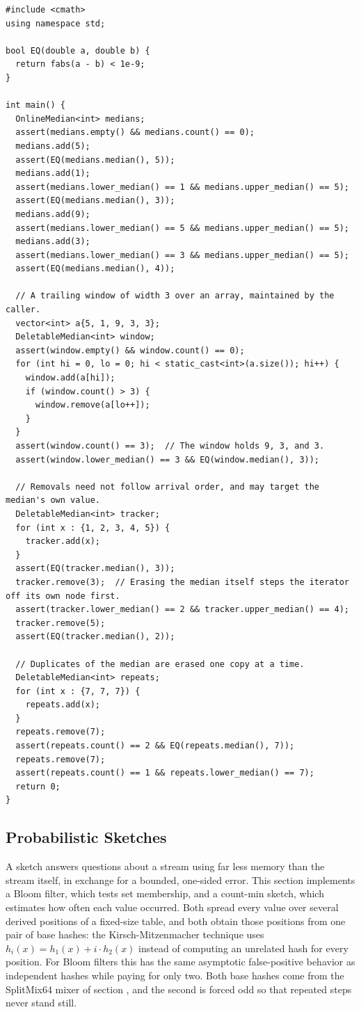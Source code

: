 \begin{lstlisting}[style=cpp]
#include <cmath>
using namespace std;

bool EQ(double a, double b) {
  return fabs(a - b) < 1e-9;
}

int main() {
  OnlineMedian<int> medians;
  assert(medians.empty() && medians.count() == 0);
  medians.add(5);
  assert(EQ(medians.median(), 5));
  medians.add(1);
  assert(medians.lower_median() == 1 && medians.upper_median() == 5);
  assert(EQ(medians.median(), 3));
  medians.add(9);
  assert(medians.lower_median() == 5 && medians.upper_median() == 5);
  medians.add(3);
  assert(medians.lower_median() == 3 && medians.upper_median() == 5);
  assert(EQ(medians.median(), 4));

  // A trailing window of width 3 over an array, maintained by the caller.
  vector<int> a{5, 1, 9, 3, 3};
  DeletableMedian<int> window;
  assert(window.empty() && window.count() == 0);
  for (int hi = 0, lo = 0; hi < static_cast<int>(a.size()); hi++) {
    window.add(a[hi]);
    if (window.count() > 3) {
      window.remove(a[lo++]);
    }
  }
  assert(window.count() == 3);  // The window holds 9, 3, and 3.
  assert(window.lower_median() == 3 && EQ(window.median(), 3));

  // Removals need not follow arrival order, and may target the median's own value.
  DeletableMedian<int> tracker;
  for (int x : {1, 2, 3, 4, 5}) {
    tracker.add(x);
  }
  assert(EQ(tracker.median(), 3));
  tracker.remove(3);  // Erasing the median itself steps the iterator off its own node first.
  assert(tracker.lower_median() == 2 && tracker.upper_median() == 4);
  tracker.remove(5);
  assert(EQ(tracker.median(), 2));

  // Duplicates of the median are erased one copy at a time.
  DeletableMedian<int> repeats;
  for (int x : {7, 7, 7}) {
    repeats.add(x);
  }
  repeats.remove(7);
  assert(repeats.count() == 2 && EQ(repeats.median(), 7));
  repeats.remove(7);
  assert(repeats.count() == 1 && repeats.lower_median() == 7);
  return 0;
}
\end{lstlisting}
\subsection{Probabilistic Sketches}
\label{sec:1.6.6}
A sketch answers questions about a stream using far less memory than the stream itself, in exchange for a bounded, one-sided error. This section implements a Bloom filter, which tests set membership, and a count-min sketch, which estimates how often each value occurred. Both spread every value over several derived positions of a fixed-size table, and both obtain those positions from one pair of base hashes: the Kirsch-Mitzenmacher technique uses $h_i(x) = h_1(x) + i \cdot h_2(x)$ instead of computing an unrelated hash for every position. For Bloom filters this has the same asymptotic false-positive behavior as independent hashes while paying for only two. Both base hashes come from the SplitMix64 mixer of section , and the second is forced odd so that repeated steps never stand still.

